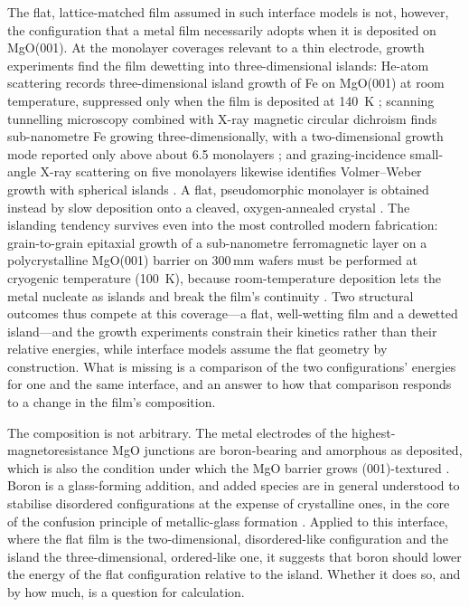The flat, lattice-matched film assumed in such interface models is not, however, the configuration
that a metal film necessarily adopts when it is deposited on MgO(001). At the monolayer coverages
relevant to a thin electrode, growth experiments find the film dewetting into three-dimensional
islands: He-atom scattering records three-dimensional island growth of Fe on MgO(001) at room
temperature, suppressed only when the film is deposited at 140~K \cite{fahsold2000}; scanning
tunnelling microscopy combined with X-ray magnetic circular dichroism finds sub-nanometre Fe growing
three-dimensionally, with a two-dimensional growth mode reported only above about 6.5 monolayers
\cite{torelli2009}; and grazing-incidence small-angle X-ray scattering on five monolayers likewise
identifies Volmer--Weber growth with spherical islands \cite{reitinger2007}. A flat, pseudomorphic
monolayer is obtained instead by slow deposition onto a cleaved, oxygen-annealed crystal
\cite{urano1988}. The islanding tendency survives even into the most controlled modern fabrication:
grain-to-grain epitaxial growth of a sub-nanometre ferromagnetic layer on a polycrystalline
MgO(001) barrier on 300\,mm wafers must be performed at cryogenic temperature (100~K), because
room-temperature deposition lets the metal nucleate as islands and break the film's continuity
\cite{ichinose2025}. Two structural outcomes thus compete at this coverage---a flat, well-wetting
film and a dewetted island---and the growth experiments constrain their kinetics rather than their
relative energies, while interface models assume the flat geometry by construction. What is missing
is a comparison of the two configurations' energies for one and the same interface, and an answer to
how that comparison responds to a change in the film's composition.

The composition is not arbitrary. The metal electrodes of the highest-magnetoresistance MgO
junctions are boron-bearing and amorphous as deposited, which is also the condition under which the
MgO barrier grows (001)-textured \cite{djayaprawira2005}. Boron is a glass-forming addition, and
added species are in general understood to stabilise disordered configurations at the expense of
crystalline ones, in the core of the confusion principle of metallic-glass formation
\cite{greer1993}. Applied to this interface, where the flat film is the two-dimensional,
disordered-like configuration and the island the three-dimensional, ordered-like one, it suggests
that boron should lower the energy of the flat configuration relative to the island. Whether it does
so, and by how much, is a question for calculation.

